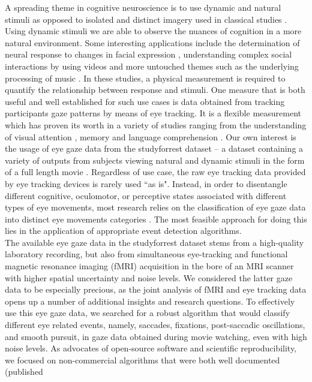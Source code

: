 A spreading theme in cognitive neuroscience is to use dynamic and natural stimuli as opposed to isolated and distinct
imagery used in classical studies \citep{real_world}. Using dynamic stimuli we are able to observe the nuances of
cognition in a more natural environment. Some interesting applications include the determination of neural response
to changes in facial expression \citep{Harris2014}, understanding complex social interactions by using videos
\citep{Tikka2012} and more untouched themes such as the underlying processing of music \citep{Toiviainen2014}.
In these studies, a physical measurement is required to quantify the relationship between response and stimuli.
One measure that is both useful and well established for such use cases is data obtained from tracking
participants gaze patterns by means of eye tracking. It is a flexible measurement which has proven its worth in a
variety of studies ranging from the understanding of visual attention \citep{HantaoLiu2011}, memory
\citep{Hannula2010} and language comprehension \citep{Gordon2006}. Our own interest is the usage of eye gaze data
from the studyforrest dataset -- a dataset containing a variety of outputs from subjects viewing natural and
dynamic stimuli in the form of a full length movie \citep{Hanke2016}.
Regardless of use case, the raw eye tracking data provided by eye tracking devices is rarely used ``as
is". Instead, in order to disentangle different cognitive, oculomotor, or perceptive states associated with
different types of eye movements, most research relies on the classification of eye gaze data into distinct eye
movements categories \citep{Schutz2011}. The most feasible approach for doing this lies in the application of
appropriate event detection algorithms. \\
The available eye gaze data in the studyforrest dataset stems from a high-quality laboratory recording, but also
from simultaneous eye-tracking and functional magnetic resonance imaging (fMRI) acquisition in the bore of an MRI
scanner with higher spatial uncertainty and noise levels. We considered the latter gaze data to be especially precious,
as the joint analysis of fMRI and eye tracking data opens up a number of additional insights and research
questions. To effectively use this eye gaze data, we searched for a robust algorithm that would classify
different eye related events, namely, saccades, fixations, post-saccadic oscillations, and smooth pursuit, in gaze
data obtained during movie watching, even with high noise levels. As advocates of open-source software and
scientific reproducibility, we focused on non-commercial algorithms that were both well documented (published

